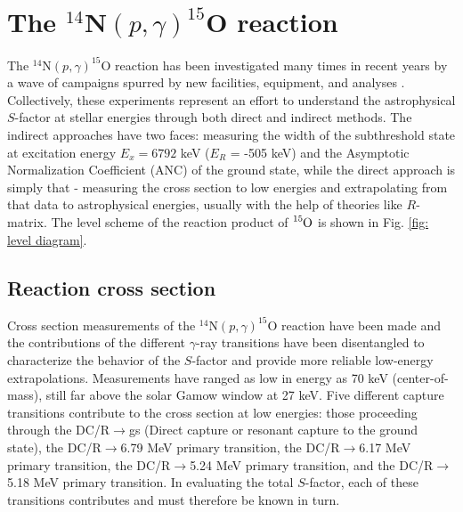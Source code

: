 \section{The $^{14}$N$\left( p,\gamma \right) ^{15}$O reaction}
\label{sec: 14N(p,g)}

The $^{14}$N$\left( p,\gamma \right) ^{15}$O reaction has been investigated many times in recent years by a wave of campaigns spurred by new facilities, equipment, and analyses \cite{Schroder1987, Bertone2001, Bertone2002, Formicola2004, Yamada2004, Imbriani2004, Imbriani2005, Runkle2005, Bemmerer2006, Lemut2006, Schurmann2008, Marta2008, Marta2010, Marta2011, Michelagnoli2013, Galinski2014, Szucs2015, Daigle2016, Li2016, Wagner2018}. Collectively, these experiments represent an effort to understand the astrophysical $S$-factor at stellar energies through both direct and indirect methods. The indirect approaches have two faces: measuring the width of the subthreshold state at excitation energy $E_{x} =6792$ keV ($E_{R}$ = -505 keV) and the Asymptotic Normalization Coefficient (ANC) of the ground state, while the direct approach is simply that - measuring the cross section to low energies and extrapolating from that data to astrophysical energies, usually with the help of theories like $R$-matrix. The level scheme of the reaction product of $\ce{^{15}O}$ is shown in Fig. \ref{fig: level diagram}.

\subsection{Reaction cross section}

Cross section measurements of the $^{14}$N$\left( p,\gamma \right) ^{15}$O reaction have been made and the contributions of the different $\gamma$-ray transitions have been disentangled to characterize the behavior of the $S$-factor  and provide more reliable low-energy extrapolations. Measurements have ranged as low in energy as 70 keV (center-of-mass), still far above the solar Gamow window at 27 keV. Five different capture transitions contribute to the cross section at low energies: those proceeding through the DC/R$\rightarrow$gs (Direct capture or resonant capture to the ground state), the DC/R$\rightarrow$6.79 MeV primary transition, the DC/R$\rightarrow$6.17 MeV primary transition, the DC/R$\rightarrow$5.24 MeV primary transition, and the DC/R$\rightarrow$5.18 MeV primary transition. In evaluating the total $S$-factor, each of these transitions contributes and must therefore be known in turn. 

